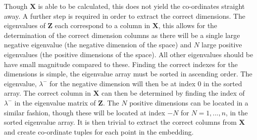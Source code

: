 Though $\boldsymbol{X}$ is able to be calculated, this does not yield the co-ordinates straight away. A further step is required in order to extract the correct dimensions. The eigenvalues of $\boldsymbol{Z}$ each correspond to a column in $\boldsymbol{X}$, this allows for the determination of the correct dimension columns as there will be a single large negative eigenvalue (the negative dimension of the space) and $N$ large positive eigenvalues (the positive dimensions of the space). All other eigenvalues should be have small magnitude compared to these. Finding the correct indexes for the dimensions is simple, the eigenvalue array must be sorted in ascending order. The eigenvalue, $\lambda^-$ for the negative dimension will then be at index 0 in the sorted array. The correct column in $\boldsymbol{X}$ can then be determined by finding the index of $\lambda^-$ in the eigenvalue matrix of $\boldsymbol{Z}$. The $N$ positive dimensions can be located in a similar fashion, though these will be located at index $-N$ for $N=1,...,n$, in the sorted eigenvalue array. It is then trivial to extract the correct columns from $\boldsymbol{X}$ and create co-ordinate tuples for each point in the embedding. 



